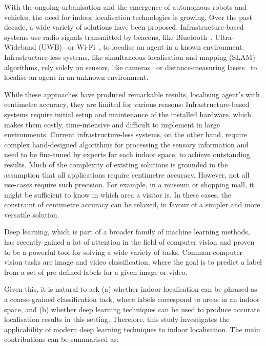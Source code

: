 \documentclass[a4paper]{article}
\begin{document}
With the ongoing urbanisation and the emergence of autonomous robots and
vehicles, the need for indoor localisation technologies is growing. Over the
past decade, a wide variety of solutions have been proposed.
Infrastructure-based systems use radio signals transmitted by beacons, like
Bluetooth~\cite{bluetooth1, bluetooth2}, Ultra-Wideband (UWB)~\cite{uwb1, uwb2}
or Wi-Fi~\cite{survey1, survey2, wireless-positioning}, to localise an agent in
a known environment. Infrastructure-less systems, like simultaneous localisation
and mapping (SLAM) algorithms, rely solely on sensors, like
cameras~\cite{mono-slam, ptam, orb-slam} or distance-measuring
lasers~\cite{lidar-slam} to localise an agent in an unknown environment.

While these approaches have produced remarkable results, localising agent's with
centimetre accuracy, they are limited for various reasons: Infrastructure-based
systems require initial setup and maintenance of the installed hardware, which
makes them costly, time-intensive and difficult to implement in large
environments. Current infrastructure-less systems, on the other hand, require
complex hand-designed algorithms for processing the sensory information and need
to be fine-tuned by experts for each indoor space, to achieve outstanding
results. Much of the complexity of existing solutions is grounded in the
assumption that all applications require centimetre accuracy. However, not all
use-cases require such precision. For example, in a museum or shopping mall, it
might be sufficient to know in which area a visitor is. In these cases, the
constraint of centimetre accuracy can be relaxed, in favour of a simpler and
more versatile solution.

Deep learning, which is part of a broader family of machine learning methods,
has recently gained a lot of attention in the field of computer vision and
proven to be a powerful tool for solving a wide variety of tasks. Common
computer vision tasks are image and video classification, where the goal is to
predict a label from a set of pre-defined labels for a given image or video. 

Given this, it is natural to ask (a) whether indoor localisation can be phrased
as a coarse-grained classification task, where labels correspond to areas in an
indoor space, and (b) whether deep learning techniques can be used to produce
accurate localisation results in this setting. Therefore, this study
investigates the applicability of modern deep learning techniques to indoor
localisation. The main contributions can be summarised as: 
\end{document}
